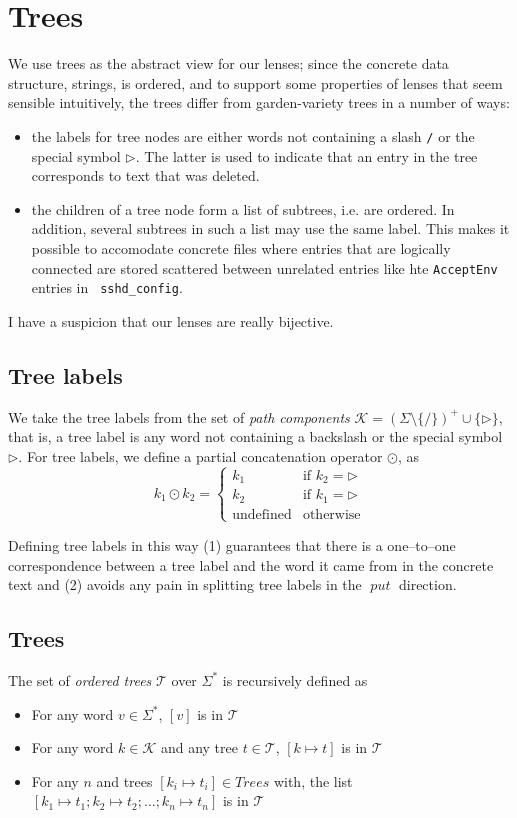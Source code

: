 \documentclass[12pt,fleqn]{amsart}
\newcommand{\ensmath}[1]{\ensuremath{#1}\xspace}
\newcommand{\opnam}[1]{\ensmath{\operatorname{\mathit{#1}}}}
\newcommand{\nput}{\opnam{put}}
\newcommand{\tree}[1]{\ensmath{[#1]}}
\newcommand{\xconc}[2]{\ensmath{#1\odot #2}}
\newcommand{\Trees}{\ensmath{\mathcal T}}
\newcommand{\Words}{\ensmath{\Sigma^*}}
\newcommand{\tmap}[2]{\ensmath{#1\mapsto #2}}
\newcommand{\Keys}{\ensmath{\mathcal{K}}}
\begin{document}
\section{Trees}
We use trees as the abstract view for our lenses; since the concrete data
structure, strings, is ordered, and to support some properties of lenses
that seem sensible intuitively, the trees differ from garden-variety trees
in a number of ways:
\begin{itemize}
  \item the labels for tree nodes are either words not containing a slash
    {\tt /} or the special symbol $\rhd$. The latter is used to indicate
    that an entry in the tree corresponds to text that was deleted.
  \item the children of a tree node form a list of subtrees, i.e. are
    ordered. In addition, several subtrees in such a list may use the same
    label. This makes it possible to accomodate concrete files where
    entries that are logically connected are stored scattered between
    unrelated entries like hte {\tt AcceptEnv} entries in {\tt
      sshd\_config}.
\end{itemize}

I have a suspicion that our lenses are really bijective.

\subsection{Tree labels}
We take the tree labels from the set of \emph{path components} $\Keys =
(\Sigma \setminus \{ {\mathtt /} \})^+ \cup \{ \rhd \}$, that is,
a tree label is any word not containing a backslash or the special symbol
$\rhd$. For tree labels, we define a partial concatenation operator
$\odot$, as
\begin{equation*}
  \xconc{k_1}{k_2} = \begin{cases}
    k_1 & \text{if } k_2 = \rhd\\
    k_2 & \text{if } k_1 = \rhd\\
    \text{undefined} & \text{otherwise}
  \end{cases}
\end{equation*}

Defining tree labels in this way (1) guarantees that there is a
one--to--one correspondence between a tree label and the word it came from
in the concrete text and (2) avoids any pain in splitting tree labels in
the \nput direction.

\subsection{Trees}
The set of \emph{ordered trees} \Trees over $\Words$ is recursively 
defined as
\begin{itemize}
\item For any word $v\in\Words$, $\tree{v}$ is in \Trees
\item For any word $k\in\Keys$ and any tree $t\in\Trees$,
  $\tree{\tmap{k}{t}}$ is in \Trees
\item For any $n$ and trees $\tree{\tmap{k_i}{t_i}} \in Trees$ with, the
  list $[\tmap{k_1}{t_1};\tmap{k_2}{t_2};\ldots;\tmap{k_n}{t_n}]$ is in
  \Trees
\end{itemize}
\end{document}
